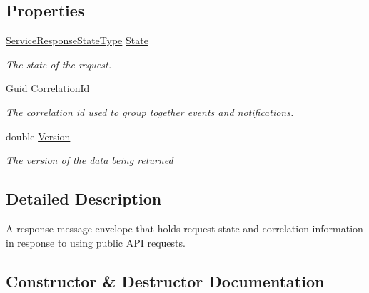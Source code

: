 \subsection*{Properties}
\begin{DoxyCompactItemize}
\item 
\hyperlink{namespaceCqrs_1_1Services_a41411b784c4fcb7eed0cef2a5b522de0_a41411b784c4fcb7eed0cef2a5b522de0}{Service\+Response\+State\+Type} \hyperlink{classCqrs_1_1Services_1_1ServiceResponse_ab93fe1cf6395706bc77ee3d670854f24_ab93fe1cf6395706bc77ee3d670854f24}{State}
\begin{DoxyCompactList}\small\item\em The state of the request. \end{DoxyCompactList}\item 
Guid \hyperlink{classCqrs_1_1Services_1_1ServiceResponse_ad6b80b1b6d1122bcbac201f41ee37124_ad6b80b1b6d1122bcbac201f41ee37124}{Correlation\+Id}
\begin{DoxyCompactList}\small\item\em The correlation id used to group together events and notifications. \end{DoxyCompactList}\item 
double \hyperlink{classCqrs_1_1Services_1_1ServiceResponse_aa6a35305c2d6e7921679e1222293b58b_aa6a35305c2d6e7921679e1222293b58b}{Version}
\begin{DoxyCompactList}\small\item\em The version of the data being returned \end{DoxyCompactList}\end{DoxyCompactItemize}


\subsection{Detailed Description}
A response message envelope that holds request state and correlation information in response to using public A\+PI requests. 



\subsection{Constructor \& Destructor Documentation}
\mbox{\label{classCqrs_1_1Services_1_1ServiceResponse_a889c3d406ffbac960699e13616f9f38b_a889c3d406ffbac960699e13616f9f38b}} 

